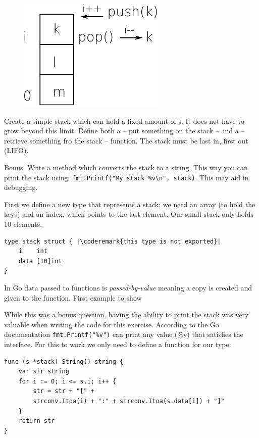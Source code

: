 \begin{Exercise}[title={Stack},difficulty=5]
\label{ex:stack}

\begin{figure}
\begin{center}
\includegraphics[scale=0.50]{fig/stack.pdf}
\end{center}
\end{figure}

\Question \label{ex:stack q1} Create a simple stack which can hold a
fixed amount of s. It does not have to grow beyond this limit.
Define both a  -- put something on the stack -- and a  
-- retrieve something fro the stack -- function. The stack must be
last in, first out (LIFO).

\Question \label{ex:stack q2} Bonus. Write a  method which 
converts the stack to a string. This way you can print the stack using:
\lstinline{fmt.Printf("My stack %v\n", stack)}. This may aid in
debugging.
\end{Exercise}

\begin{Answer}

\Question First we define a new type that represents a stack; we need an
array (to hold the keys) and an index, which points to the last element.
Our small stack only holds 10 elements.

\begin{lstlisting}
type stack struct { |\coderemark{this type is not exported}|
    i    int 
    data [10]int
}
\end{lstlisting}

In Go data passed to functions is \emph{passed-by-value} meaning a copy
is created and given to the function.  First example to show

\Question While this was a bonus question, having the ability to print
the stack was very valuable when writing the code for this exercise.
According to the Go documentation \lstinline{fmt.Printf("%v")} can
print any value (\%v) that satisfies the  interface.
For this to work we only need to define a  function for
our type:
\begin{lstlisting}
func (s *stack) String() string {
	var str string
	for i := 0; i <= s.i; i++ {
		str = str + "[" +
		strconv.Itoa(i) + ":" + strconv.Itoa(s.data[i]) + "]"
	}
	return str
}
\end{lstlisting}
\end{Answer}
